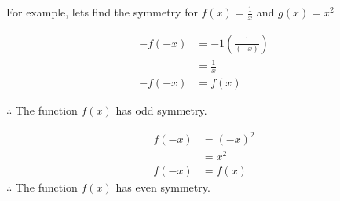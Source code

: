 \documentclass{exam}
\begin{document}
    For example, lets find the symmetry for \(f(x)=\frac{1}{x}\) and \(g(x)=x^2\)
    \begin{multicols}{2}
        \[
            \begin{aligned}
            -f(-x) &= -1\left(\frac{1}{(-x)}\right)\\
                   &= \frac{1}{x}\\
            -f(-x) &= f(x)
            \end{aligned}
        \]

        \(\therefore\) The function \(f(x)\) has odd symmetry.

        \columnbreak
        \[
            \begin{aligned}
            f(-x) &= (-x)^2\\
                   &= x^2\\
            f(-x) &= f(x)
            \end{aligned}
            \]
        \(\therefore\) The function \(f(x)\) has even symmetry. 
    \end{multicols}
\end{document}

